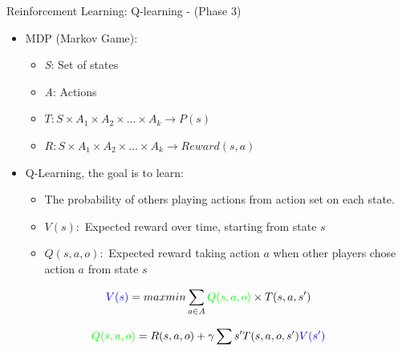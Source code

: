 \documentclass{beamer}
\begin{document}
\begin{frame}{Reinforcement Learning: Q-learning - (Phase 3)}
    \begin{itemize}
        \item MDP (Markov Game):
        \begin{itemize}
            \item \emph{S}: Set of states
            \item \emph{A}: Actions
            \item \emph{$T: S \times A_1 \times A_2 \times ... \times A_k \rightarrow P(s) $}
            \item \emph{$R: S \times A_1 \times A_2 \times ... \times A_k \rightarrow Reward(s,a) $}
        \end{itemize}
    \end{itemize}

    \begin{itemize}
        \item Q-Learning, the goal is to learn:
        \begin{itemize}
            \item The probability of others playing actions from action set on each state.
            \item $V(s): $ Expected reward over time, starting from state $s$
            \item $Q(s,a,o): $ Expected reward taking action $a$ when other players chose action $a$ from state $s$
        \end{itemize}
    \end{itemize}

    \begin{equation*}
        {\color{blue}V(s)} = max min \sum_{a \in A}{{\color{green}Q(s,a,o)} \times T(s,a,s')}
    \end{equation*}

    \begin{equation*}
        {\color{green}Q(s,a,o)} = R(s,a,o) + \gamma\sum{s'}{T(s,a,o,s'){\color{blue}V(s')}}
    \end{equation*}

\end{frame}
\end{document}
